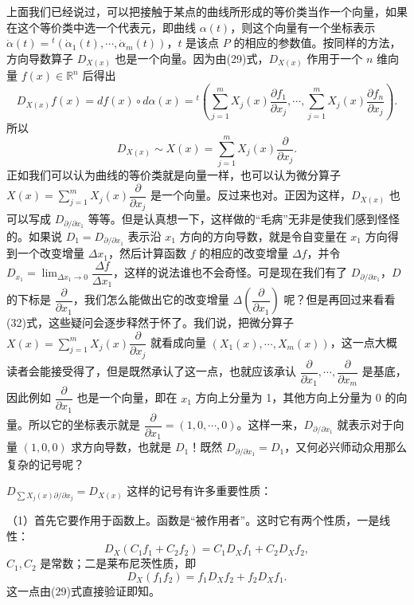 上面我们已经说过，可以把接触于某点的曲线所形成的等价类当作一个向量，如果在这个等价类中选一个代表元，即曲线 $\alpha(t)$，则这个向量有一个坐标表示 $\dot\alpha(t)={}^t(\dot\alpha_1(t),\cdots,\dot\alpha_m(t))$，$t$ 是该点 $P$ 的相应的参数值。按同样的方法，方向导数算子 $D_{X(x)}$ 也是一个向量。因为由(29)式，$D_{X(x)}$ 作用于一个 $n$ 维向量 $f(x)\in\mathbb R^n$ 后得出
\begin{equation}
 D_{X(x)}f(x)=df(x)\circ d\alpha(x)
 ={}^t\!\left(
 \sum_{j=1}^m X_j(x)\frac{\partial f_1}{\partial x_j},\cdots,
 \sum_{j=1}^m X_j(x)\frac{\partial f_n}{\partial x_j}
 \right).
 \tag{31}
\end{equation}
所以
\begin{equation}
 D_{X(x)}\sim X(x)=\sum_{j=1}^m X_j(x)\frac{\partial}{\partial x_j}.
 \tag{32}
\end{equation}
正如我们可以认为曲线的等价类就是向量一样，也可以认为微分算子 $X(x)=\sum_{j=1}^mX_j(x)\dfrac{\partial}{\partial x_j}$ 是一个向量。反过来也对。正因为这样，$D_{X(x)}$ 也可以写成 $D_{\partial/\partial x_1}$ 等等。但是认真想一下，这样做的“毛病”无非是使我们感到怪怪的。如果说 $D_1=D_{\partial/\partial x_1}$ 表示沿 $x_1$ 方向的方向导数，就是令自变量在 $x_1$ 方向得到一个改变增量 $\Delta x_1$，然后计算函数 $f$ 的相应的改变增量 $\Delta f$，并令 $D_{x_1}=\lim_{\Delta x_1\to0}\dfrac{\Delta f}{\Delta x_1}$，这样的说法谁也不会奇怪。可是现在我们有了 $D_{\partial/\partial x_1}$，$D$ 的下标是 $\dfrac{\partial}{\partial x_1}$，我们怎么能做出它的改变增量 $\Delta(\dfrac{\partial}{\partial x_1})$ 呢？但是再回过来看看(32)式，这些疑问会逐步释然于怀了。我们说，把微分算子 $X(x)=\sum_{j=1}^mX_j(x)\dfrac{\partial}{\partial x_j}$ 就看成向量 $(X_1(x),\cdots,X_m(x))$，这一点大概读者会能接受得了，但是既然承认了这一点，也就应该承认 $\dfrac{\partial}{\partial x_1},\cdots,\dfrac{\partial}{\partial x_m}$ 是基底，因此例如 $\dfrac{\partial}{\partial x_1}$ 也是一个向量，即在 $x_1$ 方向上分量为 1，其他方向上分量为 0 的向量。所以它的坐标表示就是 $\dfrac{\partial}{\partial x_1}=(1,0,\cdots,0)$。这样一来，$D_{\partial/\partial x_1}$ 就表示对于向量 $(1,0,0)$ 求方向导数，也就是 $D_1$！既然 $D_{\partial/\partial x_1}=D_1$，又何必兴师动众用那么复杂的记号呢？

$D_{\sum X_j(x)\partial/\partial x_j}=D_{X(x)}$ 这样的记号有许多重要性质：

（1）首先它要作用于函数上。函数是“被作用者”。这时它有两个性质，一是线性：
\begin{equation}
 D_X(C_1f_1+C_2f_2)=C_1D_Xf_1+C_2D_Xf_2,
 \tag{33}
\end{equation}
$C_1,C_2$ 是常数；二是莱布尼茨性质，即
\begin{equation}
 D_X(f_1f_2)=f_1D_Xf_2+f_2D_Xf_1.
 \tag{34}
\end{equation}
这一点由(29)式直接验证即知。

